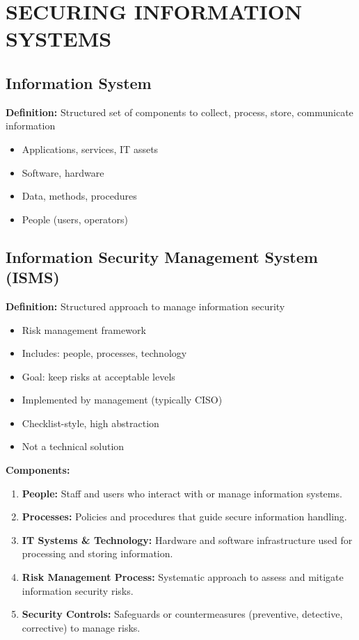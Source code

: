 \section{SECURING INFORMATION SYSTEMS}

\subsection{Information System}
{
\textbf{Definition:} Structured set of components to collect, process, store, communicate information
\begin{itemize}[noitemsep]
  \item Applications, services, IT assets
  \item Software, hardware
  \item Data, methods, procedures
  \item People (users, operators)
\end{itemize}
}
\subsection{Information Security Management System (ISMS)}
{
\textbf{Definition:} Structured approach to manage information security  
\begin{itemize}[noitemsep]
  \item Risk management framework
  \item Includes: people, processes, technology
  \item Goal: keep risks at acceptable levels
  \item Implemented by management (typically CISO)
  \item Checklist-style, high abstraction
  \item Not a technical solution
\end{itemize}

\textbf{Components:}
\begin{enumerate}[noitemsep]
  \item \textbf{People:} Staff and users who interact with or manage information systems.
  \item \textbf{Processes:} Policies and procedures that guide secure information handling.
  \item \textbf{IT Systems \& Technology:} Hardware and software infrastructure used for processing and storing information.
  \item \textbf{Risk Management Process:} Systematic approach to assess and mitigate information security risks.
  \item \textbf{Security Controls:} Safeguards or countermeasures (preventive, detective, corrective) to manage risks.
\end{enumerate}
}
